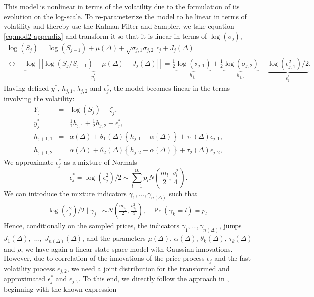 This model is nonlinear in terms of the volatility due to the formulation of its evolution on the log-scale. To re-parameterize the model to be linear in terms of volatility and thereby use the Kalman Filter and Sampler, we take equation \eqref{eq:mod2-appendix} and transform it so that it is linear in terms of $\log(\sigma_j)$,
\begin{multline*}
  \log(S_{j}) = \log(S_{j-1}) + \mu(\Delta) + \sqrt{\sigma_{j,1}\sigma_{j,2}} \, \epsilon_{j} + J_j(\Delta)  \\
 \leftrightarrow \quad \underbrace{ \log\left[ \left| \log(S_{j}/S_{j-1}) - \mu(\Delta) - J_j(\Delta) \right| \right] }_{y_j^*} = \frac{1}{2}\underbrace{  \log(\sigma_{j,1}) }_{h_{j,1}} + \frac{1}{2}\underbrace{  \log(\sigma_{j,2}) }_{h_{j,2}} + \underbrace{ \log(  \epsilon_{j,1}^2  )/2 }_{\epsilon_{j}^{*}}.
\end{multline*}
Having defined $y^*$, $h_{j,1}$, $h_{j,2}$ and $\epsilon_{j}^*$, the model becomes linear in the terms involving the volatility:
\begin{eqnarray}
	Y_j &=& \log(S_j) + \zeta_j  ,    \\
	y_j^* &=& \frac{1}{2}h_{j,1} + \frac{1}{2}h_{j,2} + \epsilon^*_{j}, \label{eq:yjstar} \\
  h_{j+1,1} &=& \alpha(\Delta) + \theta_1(\Delta) \left\{ h_{j,1}- \alpha(\Delta) \right\} + \tau_1(\Delta) \epsilon_{j,1}  \label{eq:hj1}, \\
  h_{j+1,2} &=& \alpha(\Delta) + \theta_2(\Delta) \left\{ h_{j,2}- \alpha(\Delta) \right\} + \tau_2(\Delta) \epsilon_{j,2}  \label{eq:hj2},
\end{eqnarray}
We approximate $\epsilon^*_{j}$ as a mixture of Normals
\[
	\epsilon^*_{j} = \log( \epsilon_{j}^2 )/2 \sim \sum_{l=1}^{10} p_l N \left( \frac{m_l}{2}, \frac{v_l^2}{4} \right).
\]
We can introduce the mixture indicators $\gamma_1, \ldots, \gamma_{n(\Delta)}$ such that
\begin{align*}
\log( \epsilon^2_{j} )/2 \mid \gamma_j &\sim N \left( \frac{m_{\gamma_j}}{2}, \frac{v_{\gamma_j}^2}{4} \right)   ,   &   \Pr(\gamma_k = l) = p_l .
\end{align*}
Hence, conditionally on the sampled prices, the indicators $\gamma_{1}, \ldots, \gamma_{n(\Delta)}$, jumps $J_{1}(\Delta),$ $\ldots,$ $J_{n(\Delta)}(\Delta)$, and the parameters $\mu(\Delta)$, $\alpha(\Delta)$, $\theta_k(\Delta)$, $\tau_k(\Delta)$ and $\rho$, we have again a linear state-space model with Gaussian innovations. However, due to correlation of  the innovations of the price process $\epsilon_{j}$ and the fast volatility process $\epsilon_{j,2}$, we need a joint distribution for the transformed and approximated $\epsilon_{j}^*$ and $\epsilon_{j,2}$. To this end, we directly follow the approach in \cite{omori2007stochastic}, beginning with the known expression
